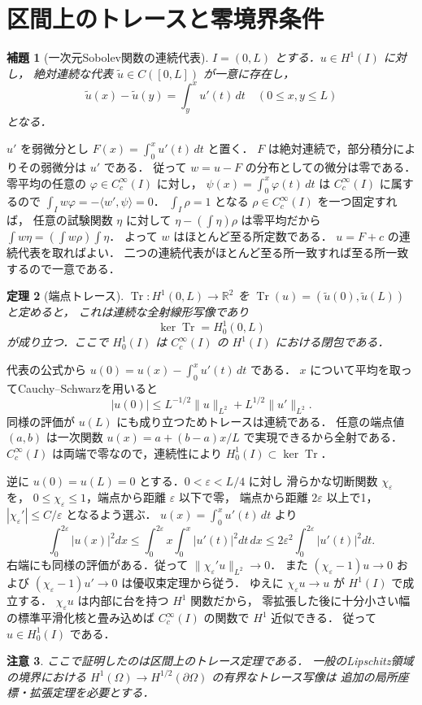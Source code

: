\documentclass[a5paper,10pt,onecolumn]{jsarticle}
\makeatletter
\theoremstyle{mathnotetheorem}
\newtheorem{theorem}{定理}[section]
\newtheorem{lemma}[theorem]{補題}
\newtheorem{remark}[theorem]{注意}
\renewcommand{\proofname}{証明}
\renewenvironment{proof}[1][\proofname]{%
  \par\pushQED{\qed}\normalfont\topsep4\p@\@plus2\p@\relax
  \trivlist\item[\hskip\labelsep\bfseries #1]\ignorespaces
}{\popQED\endtrivlist\@endpefalse}
\newcommand{\norm}[1]{\lVert #1\rVert}
\makeatother
\begin{document}
\section{区間上のトレースと零境界条件}
\begin{lemma}[一次元Sobolev関数の連続代表]
$I=(0,L)$ とする．$u\in H^1(I)$ に対し，
絶対連続な代表 $\widetilde u\in C([0,L])$ が一意に存在し，
\[
 \widetilde u(x)-\widetilde u(y)=\int_y^x u'(t)\,dt
 \quad(0\le x,y\le L)
\]
となる．
\end{lemma}
\begin{proof}
$u'$ を弱微分とし $F(x)=\int_0^x u'(t)\,dt$ と置く．
$F$ は絶対連続で，部分積分によりその弱微分は $u'$ である．
従って $w=u-F$ の分布としての微分は零である．
零平均の任意の $\varphi\in C_c^\infty(I)$ に対し，
$\psi(x)=\int_0^x\varphi(t)\,dt$ は $C_c^\infty(I)$ に属するので
$\int_I w\varphi=-\langle w',\psi\rangle=0$．
$\int_I\rho=1$ となる $\rho\in C_c^\infty(I)$ を一つ固定すれば，
任意の試験関数 $\eta$ に対して
$\eta-(\int\eta)\rho$ は零平均だから
$\int w\eta=(\int w\rho)\int\eta$．
よって $w$ はほとんど至る所定数である．
$u=F+c$ の連続代表を取ればよい．
二つの連続代表がほとんど至る所一致すれば至る所一致するので一意である．
\end{proof}
\begin{theorem}[端点トレース]
$\operatorname{Tr}:H^1(0,L)\to\mathbb R^2$ を
$\operatorname{Tr}(u)=(\widetilde u(0),\widetilde u(L))$ と定めると，
これは連続な全射線形写像であり
\[
 \ker\operatorname{Tr}=H^1_0(0,L)
\]
が成り立つ．ここで $H^1_0(I)$ は $C_c^\infty(I)$ の
$H^1(I)$ における閉包である．
\end{theorem}
\begin{proof}
代表の公式から
$u(0)=u(x)-\int_0^x u'(t)\,dt$ である．
$x$ について平均を取ってCauchy--Schwarzを用いると
\[
 |u(0)|\le L^{-1/2}\norm{u}_{L^2}
               +L^{1/2}\norm{u'}_{L^2}.
\]
同様の評価が $u(L)$ にも成り立つためトレースは連続である．
任意の端点値 $(a,b)$ は一次関数
$u(x)=a+(b-a)x/L$ で実現できるから全射である．
$C_c^\infty(I)$ は両端で零なので，連続性により
$H^1_0(I)\subset\ker\operatorname{Tr}$．

逆に $u(0)=u(L)=0$ とする．$0<\varepsilon<L/4$ に対し
滑らかな切断関数 $\chi_\varepsilon$ を，
$0\le\chi_\varepsilon\le1$，端点から距離 $\varepsilon$ 以下で零，
端点から距離 $2\varepsilon$ 以上で1，
$|\chi_\varepsilon'|\le C/\varepsilon$ となるよう選ぶ．
$u(x)=\int_0^x u'(t)\,dt$ より
\[
 \int_0^{2\varepsilon}|u(x)|^2dx
 \le\int_0^{2\varepsilon}x\int_0^x|u'(t)|^2dt\,dx
 \le2\varepsilon^2\int_0^{2\varepsilon}|u'(t)|^2dt.
\]
右端にも同様の評価がある．従って
$\norm{\chi_\varepsilon'u}_{L^2}\to0$．
また $(\chi_\varepsilon-1)u\to0$ および
$(\chi_\varepsilon-1)u'\to0$ は優収束定理から従う．
ゆえに $\chi_\varepsilon u\to u$ が $H^1(I)$ で成立する．
$\chi_\varepsilon u$ は内部に台を持つ $H^1$ 関数だから，
零拡張した後に十分小さい幅の標準平滑化核と畳み込めば
$C_c^\infty(I)$ の関数で $H^1$ 近似できる．
従って $u\in H^1_0(I)$ である．
\end{proof}
\begin{remark}
ここで証明したのは区間上のトレース定理である．
一般のLipschitz領域の境界における
$H^1(\Omega)\to H^{1/2}(\partial\Omega)$ の有界なトレース写像は
追加の局所座標・拡張定理を必要とする．
\end{remark}
\end{document}

